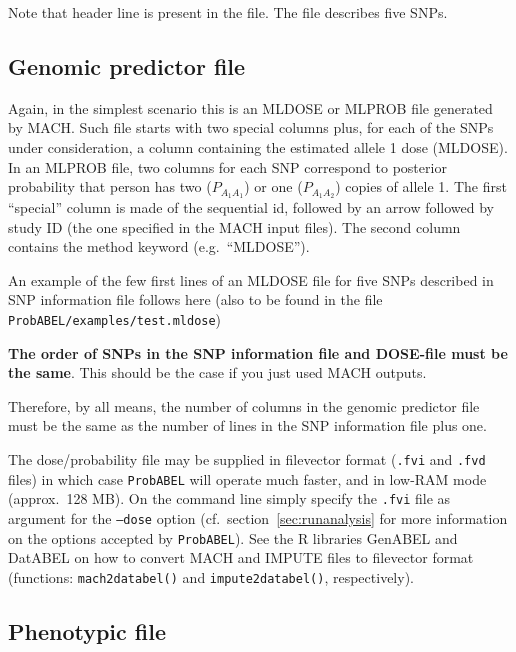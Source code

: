 \documentclass[12pt,a4paper]{article}
\begin{document}
Note that header line is present in the file. The file describes
five SNPs.

\subsection{Genomic predictor file}
\label{ssec:dosein}

Again, in the simplest scenario this is an MLDOSE or MLPROB file generated by MACH.
Such file starts with two special columns plus, for each of the SNPs
under consideration, a column containing the estimated allele 1 dose (MLDOSE).
In an MLPROB file, two columns for each SNP correspond to posterior probability
that person has two ($P_{A_1A_1}$) or one ($P_{A_1A_2}$) copies of allele 1.
The first ``special'' column is made of the sequential id,
followed by an arrow followed by study ID (the one specified in the
MACH input files). The second column contains the method  keyword
(e.g.~``MLDOSE'').

An example of the few first lines of an MLDOSE file for
five SNPs described in SNP information file follows here (also
to be found in the file \texttt{ProbABEL/examples/test.mldose})




\textbf{The order of SNPs in the SNP information file and DOSE-file
must be the same}. This should be the case if you just used MACH outputs.

Therefore, by all means, the number of columns in the genomic predictor file
must be the same as the number of lines in the SNP information file plus one.

The dose/probability file may be supplied in filevector format
(\texttt{.fvi} and \texttt{.fvd} files) in which case
\texttt{ProbABEL} will operate much faster, and in low-RAM mode
(approx.~128 MB). On the command line simply specify the \texttt{.fvi}
file as argument for the \texttt{--dose} option
(cf.~section~\ref{sec:runanalysis} for more information on the options
accepted by \texttt{ProbABEL}). See the R libraries GenABEL and
DatABEL on how to convert MACH and IMPUTE files to filevector format
(functions: \texttt{mach2databel()} and \texttt{impute2databel()},
respectively).


\subsection{Phenotypic file}
\label{ssec:phenoin}
\end{document}
